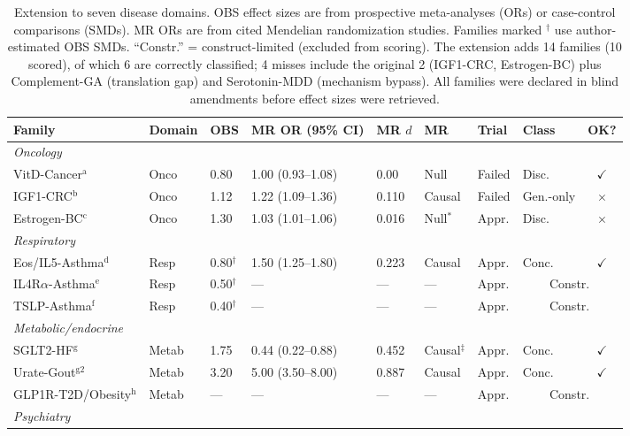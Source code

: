 \documentclass[11pt]{article}
\begin{document}
\begin{table}[t]
\centering
\caption{Extension to seven disease domains. OBS effect sizes are from prospective meta-analyses (ORs) or case-control comparisons (SMDs). MR ORs are from cited Mendelian randomization studies. Families marked $^\dagger$ use author-estimated OBS SMDs. ``Constr.'' = construct-limited (excluded from scoring). The extension adds 14 families (10 scored), of which 6 are correctly classified; 4 misses include the original 2 (IGF1-CRC, Estrogen-BC) plus Complement-GA (translation gap) and Serotonin-MDD (mechanism bypass). All families were declared in blind amendments before effect sizes were retrieved.}
\label{tab:extension}
\small
\begin{tabular}{llllllllc}
\toprule
Family & Domain & OBS & MR OR (95\% CI) & MR $d$ & MR & Trial & Class & OK? \\
\midrule
\multicolumn{9}{l}{\emph{Oncology}} \\
VitD-Cancer$^\text{a}$ & Onco & 0.80 & 1.00 (0.93--1.08) & 0.00 & Null & Failed & Disc. & $\checkmark$ \\
IGF1-CRC$^\text{b}$ & Onco & 1.12 & 1.22 (1.09--1.36) & 0.110 & Causal & Failed & Gen.-only & $\times$ \\
Estrogen-BC$^\text{c}$ & Onco & 1.30 & 1.03 (1.01--1.06) & 0.016 & Null$^*$ & Appr. & Disc. & $\times$ \\
\midrule
\multicolumn{9}{l}{\emph{Respiratory}} \\
Eos/IL5-Asthma$^\text{d}$ & Resp & 0.80$^\dagger$ & 1.50 (1.25--1.80) & 0.223 & Causal & Appr. & Conc. & $\checkmark$ \\
IL4R$\alpha$-Asthma$^\text{e}$ & Resp & 0.50$^\dagger$ & --- & --- & --- & Appr. & \multicolumn{2}{c}{Constr.} \\
TSLP-Asthma$^\text{f}$ & Resp & 0.40$^\dagger$ & --- & --- & --- & Appr. & \multicolumn{2}{c}{Constr.} \\
\midrule
\multicolumn{9}{l}{\emph{Metabolic/endocrine}} \\
SGLT2-HF$^\text{g}$ & Metab & 1.75 & 0.44 (0.22--0.88) & 0.452 & Causal$^\ddagger$ & Appr. & Conc. & $\checkmark$ \\
Urate-Gout$^\text{g2}$ & Metab & 3.20 & 5.00 (3.50--8.00) & 0.887 & Causal & Appr. & Conc. & $\checkmark$ \\
GLP1R-T2D/Obesity$^\text{h}$ & Metab & --- & --- & --- & --- & Appr. & \multicolumn{2}{c}{Constr.} \\
\midrule
\multicolumn{9}{l}{\emph{Psychiatry}} \\

\end{tabular}
\end{table}
\end{document}
